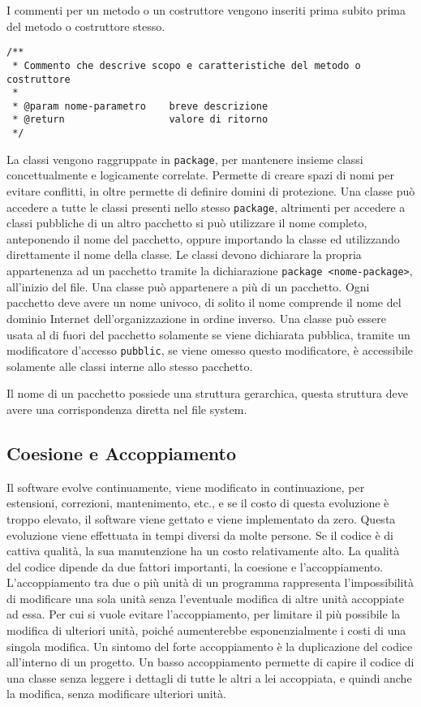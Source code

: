 \documentclass{article}
\numberwithin{equation}{subsection}
\begin{document}
I commenti per un metodo o un costruttore vengono inseriti prima subito prima del metodo o costruttore stesso. 
\begin{verbatim}
/**
 * Commento che descrive scopo e caratteristiche del metodo o costruttore
 * 
 * @param nome-parametro    breve descrizione
 * @return                  valore di ritorno
 */
\end{verbatim}

La classi vengono raggruppate in \verb|package|, per mantenere insieme classi concettualmente e logicamente correlate. Permette di creare spazi di nomi per evitare conflitti, 
in oltre permette di definire domini di protezione. 
Una classe può accedere a tutte le classi presenti nello stesso \verb|package|, altrimenti per accedere a classi pubbliche di un altro pacchetto si può utilizzare il nome completo, 
anteponendo il nome del pacchetto, oppure importando la classe ed utilizzando direttamente il nome della classe. Le classi devono dichiarare la propria appartenenza ad un 
pacchetto tramite la dichiarazione \verb|package <nome-package>|, all'inizio del file. Una classe può appartenere a più di un pacchetto. Ogni pacchetto deve avere un nome univoco, 
di solito il nome comprende il nome del dominio Internet dell'organizzazione in ordine inverso. Una classe può essere usata al di fuori del pacchetto solamente se viene dichiarata 
pubblica, tramite un modificatore d'accesso \verb|pubblic|, se viene omesso questo modificatore, è accessibile solamente alle classi interne allo stesso pacchetto.

Il nome di un pacchetto possiede una struttura gerarchica, questa struttura deve avere una corrispondenza diretta nel file system. 

\subsection{Coesione e Accoppiamento}

Il software evolve continuamente, viene modificato in continuazione, per estensioni, correzioni, mantenimento, etc., e se il costo di questa evoluzione è troppo elevato, il 
software viene gettato e viene implementato da zero. Questa evoluzione viene effettuata in tempi diversi da molte persone. 
Se il codice è di cattiva qualità, la sua manutenzione ha un costo relativamente alto. La qualità del codice dipende da due fattori importanti, la coesione e l'accoppiamento. 
L'accoppiamento tra due o più unità di un programma rappresenta l'impossibilità di modificare una sola unità senza l'eventuale modifica di altre unità accoppiate ad essa. 
Per cui si vuole evitare l'accoppiamento, per limitare il più possibile la modifica di ulteriori unità, poiché aumenterebbe esponenzialmente i costi di una singola modifica. 
Un sintomo del forte accoppiamento è la duplicazione del codice all'interno di un progetto. Un basso accoppiamento permette di capire il codice di una classe senza leggere 
i dettagli di tutte le altri a lei accoppiata, e quindi anche la modifica, senza modificare ulteriori unità. 
\end{document}
